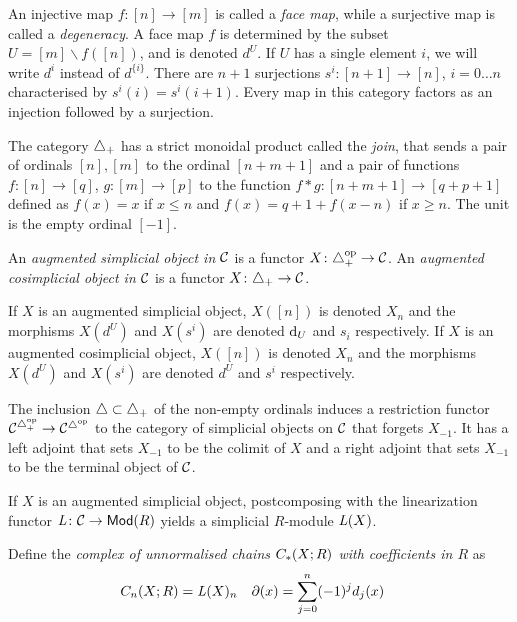 An injective map $f\colon [n]\to [m]$ is called a \emph{face map}, while a surjective map is called a \emph{degeneracy}. A face map $f$ is determined by the subset $U = [m]\smallsetminus f([n])$, and is denoted $d^U$. If $U$ has a single element $i$, we will write $d^i$ instead of $d^{\{i\}}$. There are $n+1$ surjections $s^i\colon [n+1]\to [n]$, $i = 0\ldots n$ characterised by $s^i(i) = s^i(i+1)$. Every map in this category factors as an injection followed by a surjection.

The category $\asimplex$ has a strict monoidal product called the \emph{join}, that sends a pair of ordinals $[n],[m]$ to the ordinal $[n+m+1]$ and a pair of functions $f\colon [n]\to [q]$, $g\colon [m]\to [p]$ to the function $f*g\colon [n+m+1]\to [q+p+1]$ defined as $f(x) = x$ if $x\leq  n$ and $f(x) = q+1+f(x-n)$ if $x\geq n$. The unit is the empty ordinal $[-1]$.

\begin{definition}
	An \emph{augmented simplicial object in $\cC$} is a functor $X\colon \asimplex^\mathrm{op}\to \cC$. 
	An \emph{augmented cosimplicial object in $\cC$} is a functor $X\colon \asimplex\to \cC$. 
\end{definition}

If $X$ is an augmented simplicial object, $X([n])$ is denoted $X_n$ and the morphisms $X(d^U)$ and $X(s^i)$ are denoted $\d_U$ and $s_i$ respectively. If $X$ is an augmented cosimplicial object, $X([n])$ is denoted $X_n$ and the morphisms $X(d^U)$ and $X(s^i)$ are denoted $d^U$ and $s^i$ respectively. 

The inclusion $\simplex\subset \asimplex$ of the non-empty ordinals induces a restriction functor $\cC^{\asimplex^{\op}}\to \cC^{\simplex^{\op}}$ to the category of simplicial objects on $\cC$ that forgets $X_{-1}$. It has a left adjoint that sets $X_{-1}$ to be the colimit of $X$ and a right adjoint that sets $X_{-1}$ to be the terminal object of $\cC$.

If $X$ is an augmented simplicial object, postcomposing with the linearization functor $\abel\colon \cC\to \Mod{R}$ yields a simplicial $R$-module $\abel(X)$. 

Define the \emph{complex of unnormalised chains $\ucadenas(X;R)$ with coefficients in $R$} as
\begin{align*}
	\ucadenas[n](X;R) &= \abel(X)_n
	&
	\partial(x) &= \sum_{j=0}^{n} (-1)^jd_j(x)
\end{align*}


